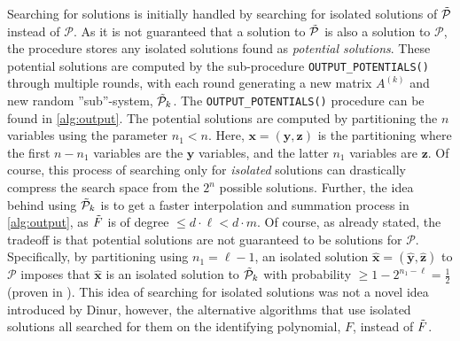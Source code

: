 Searching for solutions is initially handled by searching for isolated solutions of $\Tilde{\mathcal{P}}$ instead of $\mathcal{P}$. As it is not guaranteed that a solution to $\Tilde{\mathcal{P}}$ is also a solution to $\mathcal{P}$, the procedure stores any isolated solutions found as \textit{potential solutions}. These potential solutions are computed by the sub-procedure \texttt{OUTPUT\_POTENTIALS()} through multiple rounds, with each round generating a new matrix $A^{(k)}$ and new random ''sub''-system, $\Tilde{\mathcal{P}}_k$. The \texttt{OUTPUT\_POTENTIALS()} procedure can be found in \cref{alg:output}. The potential solutions are computed by partitioning the $n$ variables using the parameter $n_1 < n$. Here, $\mathbf{x} = (\mathbf{y}, \mathbf{z})$ is the partitioning where the first $n - n_1$ variables are the $\mathbf{y}$ variables, and the latter $n_1$ variables are $\mathbf{z}$. Of course, this process of searching only for \textit{isolated} solutions can drastically compress the search space from the $2^n$ possible solutions. Further, the idea behind using $\Tilde{\mathcal{P}}_k$ is to get a faster interpolation and summation process in \cref{alg:output}, as $\Tilde{F}$ is of degree $ \leq d \cdot \ell < d \cdot m$. Of course, as already stated, the tradeoff is that potential solutions are not guaranteed to be solutions for $\mathcal{P}$. Specifically, by partitioning using $n_1 = \ell - 1$, an isolated solution $\hat{\mathbf{x}} = (\mathbf{\hat{y}}, \mathbf{\hat{z}})$ to $\mathcal{P}$ imposes that $\hat{\mathbf{x}}$ is an isolated solution to $\Tilde{\mathcal{P}}_k$ with probability $\geq 1 - 2^{n_1 - \ell} = \frac{1}{2}$ (proven in \cite{eurocrypt-2021-30841}). This idea of searching for isolated solutions was not a novel idea introduced by Dinur, however, the alternative algorithms that use isolated solutions all searched for them on the identifying polynomial, $F$, instead of $\Tilde{F}$.


